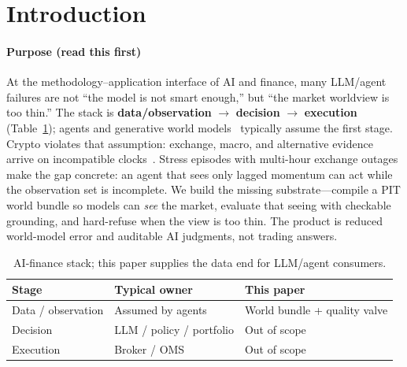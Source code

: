\documentclass[sigconf,anonymous]{acmart}
\theoremstyle{acmdefinition}%
\theoremstyle{acmplain}%
\begin{document}


\maketitle

\section{Introduction}
\label{sec:intro}

\paragraph{Purpose (read this first)}
At the methodology--application interface of AI and finance, many LLM/agent failures are not ``the model is not smart enough,'' but ``the market worldview is too thin.''
The stack is \textbf{data/observation} \(\to\) \textbf{decision} \(\to\) \textbf{execution} (Table~\ref{tab:stack}); agents and generative world models~\cite{yao2023react,yu2023finmem,zhang2024finagent,ha2018world,hafner2020dreamer,lecun2022path} typically assume the first stage.
Crypto violates that assumption: exchange, macro, and alternative evidence arrive on incompatible clocks~\cite{makarov2020,liu2022}.
Stress episodes with multi-hour exchange outages make the gap concrete: an agent that sees only lagged momentum can act while the observation set is incomplete.
We build the missing substrate---compile a PIT world bundle so models can \emph{see} the market, evaluate that seeing with checkable grounding, and hard-refuse when the view is too thin.
The product is reduced world-model error and auditable AI judgments, not trading answers.

\begin{table}[t]
  \caption{AI-finance stack; this paper supplies the data end for LLM/agent consumers.}
  \label{tab:stack}
  \small
  \begin{tabular}{@{}l l p{}@{}}
    \toprule
    Stage & Typical owner & This paper \\
    \midrule
    Data / observation & Assumed by agents & World bundle + quality valve \\
    Decision & LLM / policy / portfolio & Out of scope \\
    Execution & Broker / OMS & Out of scope \\
    \bottomrule
  \end{tabular}
\end{table}
\end{document}
